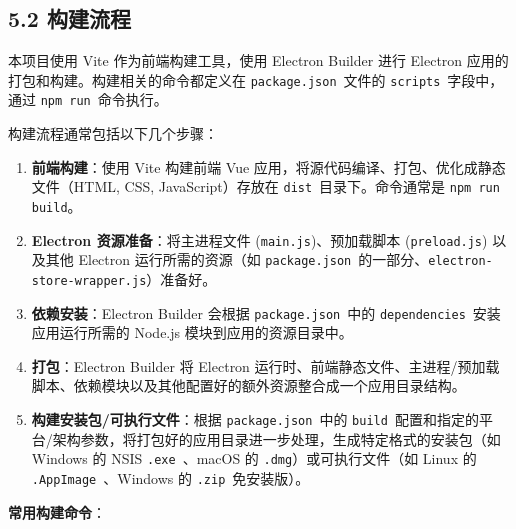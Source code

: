 \documentclass{article}
\begin{document}
\subsection*{5.2 构建流程}

本项目使用 Vite 作为前端构建工具，使用 Electron Builder 进行 Electron 应用的打包和构建。构建相关的命令都定义在 \texttt{package.json}\ 文件的 \texttt{scripts}\ 字段中，通过 \texttt{npm run}\ 命令执行。

构建流程通常包括以下几个步骤：

\begin{enumerate}[label=\arabic*.]
    \item \textbf{前端构建}：使用 Vite 构建前端 Vue 应用，将源代码编译、打包、优化成静态文件（HTML, CSS, JavaScript）存放在 \texttt{dist}\ 目录下。命令通常是 \texttt{npm run build}。
    \item \textbf{Electron 资源准备}：将主进程文件 (\texttt{main.js})、预加载脚本 (\texttt{preload.js}) 以及其他 Electron 运行所需的资源（如 \texttt{package.json}\ 的一部分、\texttt{electron-store-wrapper.js}）准备好。
    \item \textbf{依赖安装}：Electron Builder 会根据 \texttt{package.json}\ 中的 \texttt{dependencies}\ 安装应用运行所需的 Node.js 模块到应用的资源目录中。
    \item \textbf{打包}：Electron Builder 将 Electron 运行时、前端静态文件、主进程/预加载脚本、依赖模块以及其他配置好的额外资源整合成一个应用目录结构。
    \item \textbf{构建安装包/可执行文件}：根据 \texttt{package.json}\ 中的 \texttt{build}\ 配置和指定的平台/架构参数，将打包好的应用目录进一步处理，生成特定格式的安装包（如 Windows 的 NSIS \texttt{.exe}\ 、macOS 的 \texttt{.dmg}）或可执行文件（如 Linux 的 \texttt{.AppImage}\ 、Windows 的 \texttt{.zip}\ 免安装版）。
\end{enumerate}

\textbf{常用构建命令}：
\end{document}
